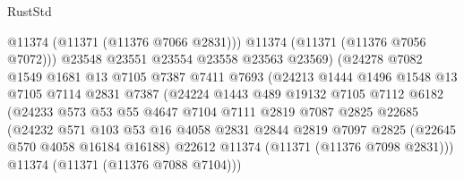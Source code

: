 \begin{lexlean}{RustStd}
\begin{coremodule}
                                  @11374
                                  (@11371 (@11376 @7066 @2831)))
                                @11374
                                (@11371 (@11376 @7056 @7072)))
                              @23548
                              @23551
                              @23554
                              @23558
                              @23563
                              @23569)
                            (@24278
                              @7082
                              @1549
                              @1681
                              @13
                              @7105
                              @7387
                              @7411
                              @7693
                              (@24213
                                @1444
                                @1496
                                @1548
                                @13
                                @7105
                                @7114
                                @2831
                                @7387
                                (@24224
                                  @1443
                                  @489
                                  @19132
                                  @7105
                                  @7112
                                  @6182
                                  (@24233
                                    @573
                                    @53
                                    @55
                                    @4647
                                    @7104
                                    @7111
                                    @2819
                                    @7087
                                    @2825
                                    @22685
                                    (@24232
                                      @571
                                      @103
                                      @53
                                      @16
                                      @4058
                                      @2831
                                      @2844
                                      @2819
                                      @7097
                                      @2825
                                      (@22645 @570 @4058 @16184 @16188)
                                      @22612
                                      @11374
                                      (@11371 (@11376 @7098 @2831)))
                                    @11374
                                    (@11371 (@11376 @7088 @7104)))

\end{coremodule}
\end{lexlean}
